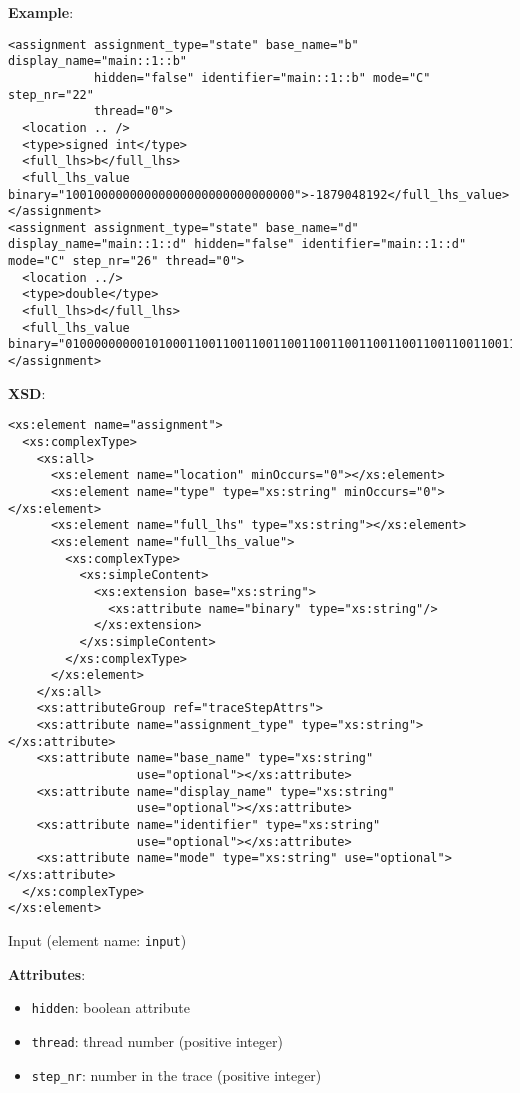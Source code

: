 \documentclass[12pt]{article}
\begin{document}
\noindent\textbf{Example}:
\begin{verbatim}
<assignment assignment_type="state" base_name="b" display_name="main::1::b"
            hidden="false" identifier="main::1::b" mode="C" step_nr="22"
            thread="0">
  <location .. />
  <type>signed int</type>
  <full_lhs>b</full_lhs>
  <full_lhs_value binary="10010000000000000000000000000000">-1879048192</full_lhs_value>
</assignment>
<assignment assignment_type="state" base_name="d" display_name="main::1::d" hidden="false" identifier="main::1::d" mode="C" step_nr="26" thread="0">
  <location ../>
  <type>double</type>
  <full_lhs>d</full_lhs>
  <full_lhs_value
binary="0100000000010100011001100110011001100110011001100110011001100110">5.1</full_lhs_value>
</assignment>
\end{verbatim}

\noindent\textbf{XSD}:
\begin{verbatim}
<xs:element name="assignment">
  <xs:complexType>
    <xs:all>
      <xs:element name="location" minOccurs="0"></xs:element>
      <xs:element name="type" type="xs:string" minOccurs="0"></xs:element>
      <xs:element name="full_lhs" type="xs:string"></xs:element>
      <xs:element name="full_lhs_value">
        <xs:complexType>
          <xs:simpleContent>
            <xs:extension base="xs:string">
              <xs:attribute name="binary" type="xs:string"/>
            </xs:extension>
          </xs:simpleContent>
        </xs:complexType>
      </xs:element>
    </xs:all>
    <xs:attributeGroup ref="traceStepAttrs">
    <xs:attribute name="assignment_type" type="xs:string"></xs:attribute>
    <xs:attribute name="base_name" type="xs:string"
                  use="optional"></xs:attribute>
    <xs:attribute name="display_name" type="xs:string"
                  use="optional"></xs:attribute>
    <xs:attribute name="identifier" type="xs:string"
                  use="optional"></xs:attribute>
    <xs:attribute name="mode" type="xs:string" use="optional"></xs:attribute>
  </xs:complexType>
</xs:element>
\end{verbatim}


\begin{center}
{\Large Input} (element name: \texttt{input})
\end{center}

\noindent\textbf{Attributes}:
\begin{itemize}
\item \texttt{hidden}: boolean attribute
\item \texttt{thread}: thread number (positive integer)
\item \texttt{step\_nr}: number in the trace (positive integer)
\end{itemize}
\end{document}
